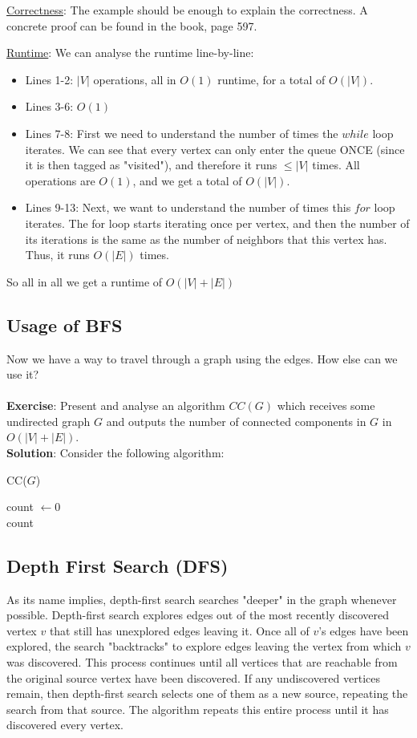 \underline{Correctness}: The example should be enough to explain the correctness. A concrete proof can be found in the book, page 597.

\underline{Runtime}: We can analyse the runtime line-by-line:
\begin{itemize}
\item Lines 1-2: $|V|$ operations, all in $O(1)$ runtime, for a total of $O(|V|)$.
\item Lines 3-6: $O(1)$
\item Lines 7-8: First we need to understand the number of times the $while$ loop iterates. We can see that every vertex can only enter the queue ONCE (since it is then tagged as "visited"), and therefore it runs $\leq |V|$ times. All operations are $O(1)$, and we get a total of $O(|V|)$. 
\item Lines 9-13: Next, we want to understand the number of times this $for$ loop iterates. 
The for loop starts iterating once per vertex, and then the number of its iterations is the same as the number of neighbors that this vertex has. Thus, it runs $O(|E|)$ times.
\end{itemize}
So all in all we get a runtime of $O(|V|+|E|)$

\subsection{Usage of BFS}
Now we have a way to travel through a graph using the edges. How else can we use it?\\ \\ 
\textbf{Exercise}: Present and analyse an algorithm $CC(G)$ which receives some undirected graph $G$ and outputs the number of connected components in $G$ in $O(|V|+|E|)$. \\

\textbf{Solution}: Consider the following algorithm: 

  \begin{algorithm}
  \caption{CC($G$)}
     count $\leftarrow 0$\\
	\Return count
  \end{algorithm}

\subsection{Depth First Search (DFS)}
As its name implies, depth-first search searches "deeper" in the graph whenever possible. Depth-first search explores edges out of the most recently discovered vertex $v$ that still has unexplored edges leaving it. Once all of $ v$'s edges have been explored, the search "backtracks" to explore edges leaving the vertex from which $v$ was discovered. This process continues until all vertices that are reachable from the original source vertex have been discovered. If any undiscovered vertices remain, then depth-first search selects one of them as a new source, repeating the search from that source. The algorithm repeats this entire process until it has discovered every vertex.

